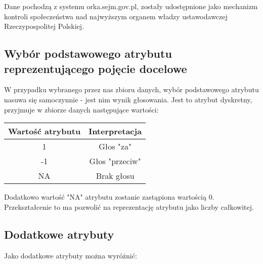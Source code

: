 \documentclass[a4 14pt]{report}
\begin{document}
			Dane pochodzą z systemu orka.sejm.gov.pl, zostały udostępnione jako mechanizm kontroli społeczeństwa nad najwyższym organem władzy ustawodawczej Rzeczypospolitej Polskiej.

		\subsection{Wybór podstawowego atrybutu reprezentującego pojęcie docelowe}

			W przypadku wybranego przez nas zbioru danych, wybór podstawowego atrybutu nasuwa się samoczynnie - jest nim wynik głosowania. Jest to atrybut dyskretny, przyjmuje w zbiorze danych następujące wartości:
			
			\renewcommand{\arraystretch}{1.2}
			\begin{center}
				\begin{tabular}{c|c}
    					Wartość atrybutu & Interpretacja \\ \hline
					1 & Głos "za" \\ 
    					-1 & Głos "przeciw" \\
    					NA & Brak głosu \\
 				\end{tabular}
			\end{center}

			Dodatkowo wartość "NA" atrybutu zostanie zastąpiona wartością 0. Przekształcenie to ma pozwolić na reprezentację atrybutu jako liczby całkowitej.	

		\subsection{Dodatkowe atrybuty}
			
			Jako dodatkowe atrybuty można wyróżnić:
\end{document}

